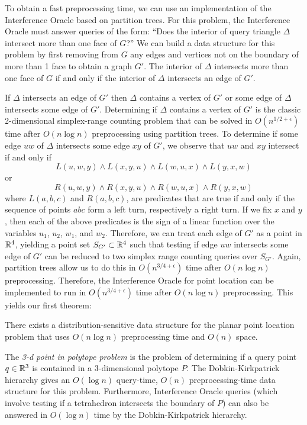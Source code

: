 \documentclass{patmorin}
\begin{document}
To obtain a fast preprocessing time, we can use an
implementation of the Interference Oracle based on partition trees.  For
this problem, the Interference Oracle must answer queries of the form:
``Does the interior of query triangle $\Delta$ intersect more than one face
of $G$?''  We can build a data structure for this problem by first removing
from $G$ any edges and vertices not on the boundary of more than 1 face to
obtain a graph $G'$.  The interior of $\Delta$ intersects more than one
face of $G$ if and only if the interior of $\Delta$ intersects an edge of
$G'$.

If $\Delta$ intersects an edge of $G'$ then $\Delta$ contains a vertex of
$G'$ or some edge of $\Delta$ intersects some edge of $G'$.  Determining if
$\Delta$ contains a vertex of $G'$ is the classic 2-dimensional
simplex-range counting problem that can be solved in $O(n^{1/2+\epsilon})$
time after $O(n\log n)$ preprocessing using partition trees.  To determine
if some edge $uw$ of $\Delta$ intersects some edge $xy$ of $G'$, we observe
that $uw$ and $xy$ intersect if and only if
\[ L(u,w,y) \wedge L(x,y,u) \wedge L(w,u,x) \wedge L(y,x,w) \]
or
\[ R(u,w,y) \wedge R(x,y,u) \wedge R(w,u,x) \wedge R(y,x,w) \]
where $L(a,b,c)$ and $R(a,b,c)$, are predicates that are true if and
only if the sequence of points $abc$ form a left turn, respectively a
right turn.  If we fix $x$ and $y$, then each of the above predicates is
the sign of a linear function over the variables $u_1$, $u_2$, $w_1$,
and $w_2$.  Therefore, we can treat each edge of $G'$ as a point in
$\mathbb{R}^4$, yielding a point set $S_{G'} \subset\mathbb{R}^4$ such that testing if
edge $uw$ intersects some edge of $G'$ can be reduced to two simplex
range counting queries over $S_{G'}$.  Again, partition trees allow us to
do this in $O(n^{3/4+\epsilon})$ time after $O(n\log n)$ preprocessing.
Therefore, the Interference Oracle for point location can be implemented
to run in $O(n^{3/4+\epsilon})$ time after $O(n\log n)$ preprocessing.
This yields our first theorem:

\begin{thm}
  There exists a distribution-sensitive data structure for the planar
  point location problem that uses $O(n\log n)$ preprocessing time and
  $O(n)$ space.
\end{thm}

The \emph{3-d point in polytope problem} is the problem of determining if
a query point $q\in\mathbb{R}^3$ is contained in a 3-dimensional polytope $P$.
The Dobkin-Kirkpatrick hierarchy \cite{dk83} gives an $O(\log n)$
query-time, $O(n)$ preprocessing-time data structure for this problem.
Furthermore, Interference Oracle queries (which involve testing if a
tetrahedron intersects the boundary of $P$) can also be answered in $O(\log
n)$ time by the Dobkin-Kirkpatrick hierarchy.
\end{document}
